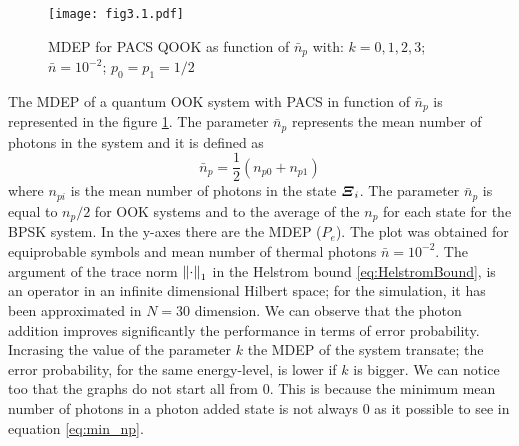     \begin{figure}[t]
        \begin{center}
            \texttt{[image: fig3.1.pdf]}
            \caption{MDEP for PACS QOOK as function of $\bar{n}_p$ with: $k=0,1,2,3$; $\bar{n}=10^{-2}$; $p_0=p_1=1/2$}
            \label{fig:3.1}
        \end{center}
    \end{figure}
    The MDEP of a quantum OOK system with PACS in function of $\bar{n}_p$ is represented in the figure
    \ref{fig:3.1}. The parameter $\bar{n}_p$ represents the mean number of photons in the system and it is 
    defined as
    \begin{equation*}
        \bar{n}_p=\frac{1}{2} \left(n_{p0}+n_{p1}\right)
    \end{equation*}
    where $n_{pi}$ is the mean number of photons in the state $\Operator{\varXi}_i$.
    The parameter $\bar{n}_p$ is equal to $n_p/2$ for OOK systems and to the average of the $n_p$ for 
    each state for the BPSK system.
    In the y-axes there are the MDEP ($P_e$). The plot was obtained for equiprobable symbols and 
    mean number of thermal photons $\bar{n}=10^{-2}$.  
    The argument of the trace norm $\norm{\cdot}_1$ in the Helstrom bound 
    \ref{eq:HelstromBound}, is an operator in an infinite dimensional Hilbert space; for the 
    simulation, it has been approximated in $N=30$ dimension.
    We can observe that the photon addition improves significantly the performance in terms
    of error probability. Incrasing the value of the parameter $k$ the MDEP of the system 
    transate; the error probability, for the same energy-level, is lower if $k$ is bigger.
    We can notice too that the graphs do not start all from $0$. This is because the minimum
    mean number of photons in a photon added state is not always $0$ as it possible to see in 
    equation \ref{eq:min_np}.  

